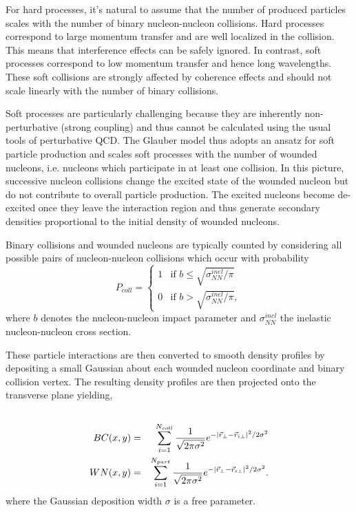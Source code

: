 \documentclass[aps,prc,reprint,amsmath,nofootinbib]{revtex4-1}
\begin{document}
For hard processes, it's natural to assume that the number of produced particles scales with the number of binary nucleon-nucleon collisions. Hard processes correspond
to large momentum transfer and are well localized in the collision. This means that interference effects can be safely ignored. In contrast, soft processes correspond to low 
momentum transfer and hence long wavelengths. These soft collisions are strongly affected by coherence effects and should not scale linearly with the number of
binary collisions.

Soft processes are particularly challenging because they are inherently non-perturbative (strong coupling) and thus cannot be calculated using the usual tools
of perturbative QCD. The Glauber model thus adopts an ansatz for soft particle production and scales soft processes with the number of wounded nucleons, i.e. nucleons 
which participate in at least one collision. In this picture, successive nucleon collisions change the excited state of the wounded nucleon but do not contribute to 
overall particle production. The excited nucleons become de-excited once they leave the interaction region and thus generate secondary densities proportional to the 
initial density of wounded nucleons.

Binary collisions and wounded nucleons are typically counted by considering all possible pairs of nucleon-nucleon collisions which occur with probability
\begin{equation}
P_{coll}=
\begin{cases}
  1 &\mbox{if } b \le \sqrt{\sigma^{inel}_{NN}/\pi} \\ 
  0 &\mbox{if } b > \sqrt{\sigma^{inel}_{NN}/\pi},
\end{cases}
\end{equation}
where $b$ denotes the nucleon-nucleon impact parameter and $\sigma^{inel}_{NN}$ the inelastic nucleon-nucleon cross section.

These particle interactions are then converted to smooth density profiles by depositing a small Gaussian about each wounded nucleon coordinate and binary
collision vertex. The resulting density profiles are then projected onto the transverse plane yielding,
\begin{eqnarray}
 \label{BC_WN}
 \cr BC(x,y) &=& \sum_{i=1}^{N_{coll}} \frac{1}{\sqrt{2 \pi \sigma^2}} e^{ -|\vec{r}_\perp-\vec{r}_{i\perp}|^2/2 \sigma^2 }   \\
 WN(x,y) &=& \sum_{i=1}^{N_{part}} \frac{1}{\sqrt{2 \pi \sigma^2}} e^{ -|\vec{r}_\perp-\vec{r}_{i\perp}|^2/2 \sigma^2 } .
\end{eqnarray}
where the Gaussian deposition width $\sigma$ is a free parameter.
\end{document}
